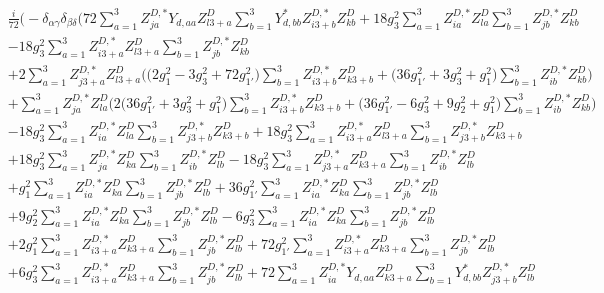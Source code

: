\begin{align} 
 &\frac{i}{72} \Big(- \delta_{\alpha \gamma} \delta_{\beta \delta} \Big(72 \sum_{a=1}^{3}Z^{D,*}_{j a} Y_{d,{a a}} Z_{{l 3 + a}}^{D}  \sum_{b=1}^{3}Y^*_{d,{b b}} Z^{D,*}_{i 3 + b} Z_{{k b}}^{D}  +18 g_{3}^{2} \sum_{a=1}^{3}Z^{D,*}_{i a} Z_{{l a}}^{D}  \sum_{b=1}^{3}Z^{D,*}_{j b} Z_{{k b}}^{D}  \nonumber \\ 
 &-18 g_{3}^{2} \sum_{a=1}^{3}Z^{D,*}_{i 3 + a} Z_{{l 3 + a}}^{D}  \sum_{b=1}^{3}Z^{D,*}_{j b} Z_{{k b}}^{D}  \nonumber \\ 
 &+2 \sum_{a=1}^{3}Z^{D,*}_{j 3 + a} Z_{{l 3 + a}}^{D}  \Big(\Big(2 g_{1}^{2}  -3 g_{3}^{2}  + 72 g_{1'}^{2} \Big)\sum_{b=1}^{3}Z^{D,*}_{i 3 + b} Z_{{k 3 + b}}^{D}   + \Big(36 g_{1'}^{2}  + 3 g_{3}^{2}  + g_{1}^{2}\Big)\sum_{b=1}^{3}Z^{D,*}_{i b} Z_{{k b}}^{D}  \Big)\nonumber \\ 
 &+\sum_{a=1}^{3}Z^{D,*}_{j a} Z_{{l a}}^{D}  \Big(2 \Big(36 g_{1'}^{2}  + 3 g_{3}^{2}  + g_{1}^{2}\Big)\sum_{b=1}^{3}Z^{D,*}_{i 3 + b} Z_{{k 3 + b}}^{D}   + \Big(36 g_{1'}^{2}  -6 g_{3}^{2}  + 9 g_{2}^{2}  + g_{1}^{2}\Big)\sum_{b=1}^{3}Z^{D,*}_{i b} Z_{{k b}}^{D}  \Big)\nonumber \\ 
 &-18 g_{3}^{2} \sum_{a=1}^{3}Z^{D,*}_{i a} Z_{{l a}}^{D}  \sum_{b=1}^{3}Z^{D,*}_{j 3 + b} Z_{{k 3 + b}}^{D}  +18 g_{3}^{2} \sum_{a=1}^{3}Z^{D,*}_{i 3 + a} Z_{{l 3 + a}}^{D}  \sum_{b=1}^{3}Z^{D,*}_{j 3 + b} Z_{{k 3 + b}}^{D}  \nonumber \\ 
 &+18 g_{3}^{2} \sum_{a=1}^{3}Z^{D,*}_{j a} Z_{{k a}}^{D}  \sum_{b=1}^{3}Z^{D,*}_{i b} Z_{{l b}}^{D}  -18 g_{3}^{2} \sum_{a=1}^{3}Z^{D,*}_{j 3 + a} Z_{{k 3 + a}}^{D}  \sum_{b=1}^{3}Z^{D,*}_{i b} Z_{{l b}}^{D}  \nonumber \\ 
 &+g_{1}^{2} \sum_{a=1}^{3}Z^{D,*}_{i a} Z_{{k a}}^{D}  \sum_{b=1}^{3}Z^{D,*}_{j b} Z_{{l b}}^{D}  +36 g_{1'}^{2} \sum_{a=1}^{3}Z^{D,*}_{i a} Z_{{k a}}^{D}  \sum_{b=1}^{3}Z^{D,*}_{j b} Z_{{l b}}^{D}  \nonumber \\ 
 &+9 g_{2}^{2} \sum_{a=1}^{3}Z^{D,*}_{i a} Z_{{k a}}^{D}  \sum_{b=1}^{3}Z^{D,*}_{j b} Z_{{l b}}^{D}  -6 g_{3}^{2} \sum_{a=1}^{3}Z^{D,*}_{i a} Z_{{k a}}^{D}  \sum_{b=1}^{3}Z^{D,*}_{j b} Z_{{l b}}^{D}  \nonumber \\ 
 &+2 g_{1}^{2} \sum_{a=1}^{3}Z^{D,*}_{i 3 + a} Z_{{k 3 + a}}^{D}  \sum_{b=1}^{3}Z^{D,*}_{j b} Z_{{l b}}^{D}  +72 g_{1'}^{2} \sum_{a=1}^{3}Z^{D,*}_{i 3 + a} Z_{{k 3 + a}}^{D}  \sum_{b=1}^{3}Z^{D,*}_{j b} Z_{{l b}}^{D}  \nonumber \\ 
 &+6 g_{3}^{2} \sum_{a=1}^{3}Z^{D,*}_{i 3 + a} Z_{{k 3 + a}}^{D}  \sum_{b=1}^{3}Z^{D,*}_{j b} Z_{{l b}}^{D}  +72 \sum_{a=1}^{3}Z^{D,*}_{i a} Y_{d,{a a}} Z_{{k 3 + a}}^{D}  \sum_{b=1}^{3}Y^*_{d,{b b}} Z^{D,*}_{j 3 + b} Z_{{l b}}^{D}  \nonumber \\ 

\end{align}
